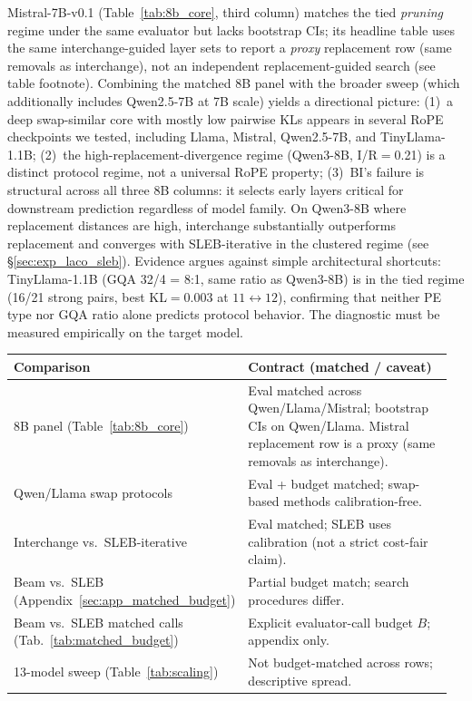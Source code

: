 \documentclass{article}
\newenvironment{tabhere}{%
  \par\medskip
  \begin{center}
}{%
  \end{center}
  \medskip
}
\begin{document}
Mistral-7B-v0.1 (Table~\ref{tab:8b_core}, third column) matches the tied \emph{pruning} regime under the same evaluator but lacks bootstrap CIs; its headline table uses the same interchange-guided layer sets to report a \emph{proxy} replacement row (same removals as interchange), not an independent replacement-guided search (see table footnote). Combining the matched 8B panel with the broader sweep (which additionally includes Qwen2.5-7B at 7B scale) yields a directional picture: (1)~a deep swap-similar core with mostly low pairwise KLs appears in several RoPE checkpoints we tested, including Llama, Mistral, Qwen2.5-7B, and TinyLlama-1.1B; (2)~the high-replacement-divergence regime (Qwen3-8B, I/R$=$0.21) is a distinct protocol regime, not a universal RoPE property; (3)~BI's failure is structural across all three 8B columns: it selects early layers critical for downstream prediction regardless of model family. On Qwen3-8B where replacement distances are high, interchange substantially outperforms replacement and converges with SLEB-iterative in the clustered regime (see \S\ref{sec:exp_laco_sleb}). Evidence argues against simple architectural shortcuts: TinyLlama-1.1B (GQA 32/4 = 8:1, same ratio as Qwen3-8B) is in the tied regime (16/21 strong pairs, best KL${}=0.003$ at $11\leftrightarrow 12$), confirming that neither PE type nor GQA ratio alone predicts protocol behavior. The diagnostic must be measured empirically on the target model.

\begin{tabhere}
\footnotesize
\setlength{\tabcolsep}{4pt}
\begin{tabular}{@{}p{0.34\linewidth}>{\raggedright\arraybackslash}p{0.62\linewidth}@{}}
\toprule
\textbf{Comparison} & \textbf{Contract (matched / caveat)} \\
\midrule
8B panel (Table~\ref{tab:8b_core}) & Eval matched across Qwen/Llama/Mistral; bootstrap CIs on Qwen/Llama. Mistral replacement row is a proxy (same removals as interchange). \\
Qwen/Llama swap protocols & Eval + budget matched; swap-based methods calibration-free. \\
Interchange vs.\ SLEB-iterative & Eval matched; SLEB uses calibration (not a strict cost-fair claim). \\
Beam vs.\ SLEB (Appendix~\ref{sec:app_matched_budget}) & Partial budget match; search procedures differ. \\
Beam vs.\ SLEB matched calls (Tab.~\ref{tab:matched_budget}) & Explicit evaluator-call budget $B$; appendix only. \\
13-model sweep (Table~\ref{tab:scaling}) & Not budget-matched across rows; descriptive spread. \\
\bottomrule
\end{tabular}
\label{tab:comparison_contract}
\end{tabhere}
\end{document}
